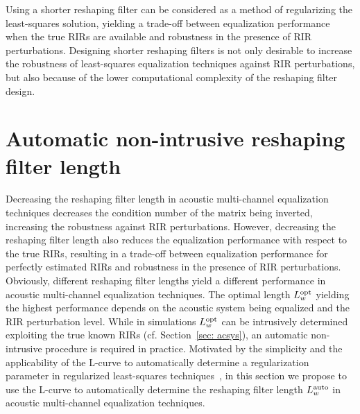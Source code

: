 \documentclass[twocolumn]{bmcart}%
\begin{document}
Using a shorter reshaping filter can be considered as a method of regularizing the least-squares solution, yielding a trade-off between equalization performance when the true RIRs are available and robustness in the presence of RIR perturbations.
Designing shorter reshaping filters is not only desirable to increase the robustness of least-squares equalization techniques against RIR perturbations, but also because of the lower computational complexity of the reshaping filter design.

\section{Automatic non-intrusive reshaping filter length}
\label{sec: lauto}
Decreasing the reshaping filter length in acoustic multi-channel equalization techniques decreases the condition number of the matrix being inverted, increasing the robustness against RIR perturbations.
However, decreasing the reshaping filter length also reduces the equalization performance with respect to the true RIRs, resulting in a trade-off between equalization performance for perfectly estimated RIRs and robustness in the presence of RIR perturbations.
Obviously, different reshaping filter lengths yield a different performance in acoustic multi-channel equalization techniques.
The optimal length $L^{\rm opt}_{w}$ yielding the highest performance depends on the acoustic system being equalized and the RIR perturbation level.
While in simulations $L^{\rm opt}_{w}$ can be intrusively determined exploiting the true known RIRs (cf. Section~\ref{sec: acsys}), an automatic non-intrusive procedure is required in practice.
Motivated by the simplicity and the applicability of the L-curve to automatically determine a regularization parameter in regularized least-squares techniques~\cite{hansen1992analysis,Hansen_1993, Kodrasi_ITASLP_2013}, in this section we propose to use the L-curve to automatically determine the reshaping filter length $L^{\rm auto}_w$ in acoustic multi-channel equalization techniques.
\end{document}
